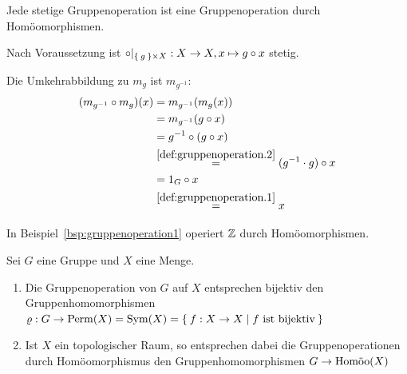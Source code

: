 \begin{korollar}%
     Jede stetige Gruppenoperation ist eine Gruppenoperation durch Homöomorphismen.
\end{korollar}
\begin{beweis}
    Nach Voraussetzung ist $\circ |_{\Set{g} \times X} : X \rightarrow X, x \mapsto g \circ x$ stetig.

    Die Umkehrabbildung zu $m_g$ ist $m_{g^{-1}}$: 
    \begin{align*}
        (m_{g^{-1}} \circ m_g)(x) &= m_{g^{-1}} (m_g (x))\\
            &= m_{g^{-1}} (g \circ x)\\
            &= g^{-1} \circ (g \circ x)\\
            &\stackrel{\ref{def:gruppenoperation.2}}{=} (g^{-1} \cdot g) \circ x\\
            &= 1_G \circ x\\
            &\stackrel{\ref{def:gruppenoperation.1}}{=} x
    \end{align*}
\end{beweis}

\begin{beispiel}
    In Beispiel~\ref{bsp:gruppenoperation1} operiert $\mdz$ durch Homöomorphismen.
\end{beispiel}

\begin{korollar}\label{kor:13.3}%
    Sei $G$ eine Gruppe und $X$ eine Menge.

    \begin{enumerate}[label=\alph*)]
        \item Die Gruppenoperation von $G$ auf $X$ entsprechen bijektiv
              den Gruppenhomomorphismen $\varrho: G \rightarrow \Perm(X) = \Sym(X) = \Set{f: X \rightarrow X | f \text{ ist bijektiv}}$
        \item Ist $X$ ein topologischer Raum, so entsprechen dabei 
              die Gruppenoperationen durch Homöomorphismus den Gruppenhomomorphismen
              $G \rightarrow \Homoo(X)$
    \end{enumerate}
\end{korollar}

